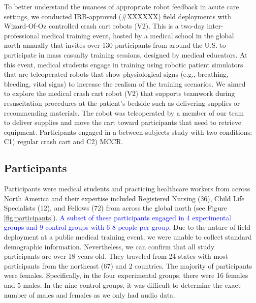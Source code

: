 To better understand the nuances of appropriate robot feedback in acute care settings, we conducted IRB-approved (\#XXXXXX) field deployments with Wizard-Of-Oz controlled crash cart robots (V2). 
This is a two-day inter-professional medical training event, hosted by a medical school in the global north annually that invites over 130 participants from around the U.S. to participate in mass casualty training sessions, designed by medical educators. 
At this event, medical students engage in training using robotic patient simulators that are teleoperated robots that show physiological signs (e.g., breathing, bleeding, vital signs) to increase the realism of the training scenarios. 
We aimed to explore the medical crash cart robot (V2) that supports teamwork during resuscitation procedures at the patient’s bedside such as delivering supplies or recommending materials. 
The robot was teleoperated by a member of our team to deliver supplies and move the cart toward participants that need to retrieve equipment. 
Participants engaged in a between-subjects study with two conditions: C1) regular crash cart and C2) MCCR.



\subsection{Participants} 

Participants were medical students and practicing healthcare workers from across North America and their expertise included Registered Nursing (36), Child Life Specialists (12), and Fellows (72) from across the global north (see Figure \ref{fig:participants}).
\textcolor{blue}{A subset of these participants engaged in 4 experimental groups and 9 control groups with 6-8 people per group.}
Due to the nature of field deployment at a public medical training event, we were unable to collect standard demographic information.
Nevertheless, we can confirm that all study participants are over 18 years old.
They traveled from 24 states with most participants from the northeast (67) and 2 countries. 
The majority of participants were females. Specifically, in the four experimental groups, there were 16 females and 5 males. In the nine control groups, it was difficult to determine the exact number of males and females as we only had audio data.



